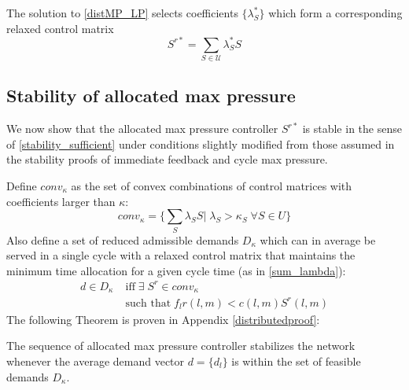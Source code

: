The solution to \eqref{distMP_LP} selects coefficients $\{ \lambda_{S}^{*} \} $ which form a corresponding relaxed control
matrix \begin{equation} S^{r*} = \displaystyle\sum_{S \in \mathcal{U}}\lambda_{S}^{*}S\end{equation}






\subsection*{Stability of allocated max pressure}

We now show that the allocated max pressure controller $S^{r*}$ is stable in the sense of \eqref{stability_sufficient} under conditions slightly modified from those assumed in the stability proofs of immediate feedback and cycle max pressure.

Define $conv_{\kappa}$ as the set of convex combinations of control matrices with coefficients larger than $\kappa$:
\begin{equation}
conv_{\kappa} = \Big\{ \sum_{S}\lambda_{S}S \big| \; \lambda_S > \kappa_S \; \forall S\in U\Big\}
\end{equation}
Also define a set of reduced admissible demands $D_{\kappa}$ which can in average be served in a single cycle with a relaxed control matrix that maintains the minimum time allocation for a given cycle time (as in \eqref{sum_lambda}):
\begin{align} \nonumber
d \in D_{\kappa} \; & \text{iff} \; \exists \; S^r \in conv_{\kappa} \; \\ & \text{such that} \; f_{l}r(l,m) < c(l,m)S^r(l,m)
\label{admissible_relaxed}
\end{align} 
The following Theorem is proven in Appendix \ref{distributedproof}:
\begin{Thm}\label{StabDistributedMP}
The sequence of allocated max pressure controller stabilizes the network
 whenever the average demand vector $d = \lbrace d_{l}\rbrace$ is within the set of feasible demands
$ D_{\kappa}$.
\end{Thm}



